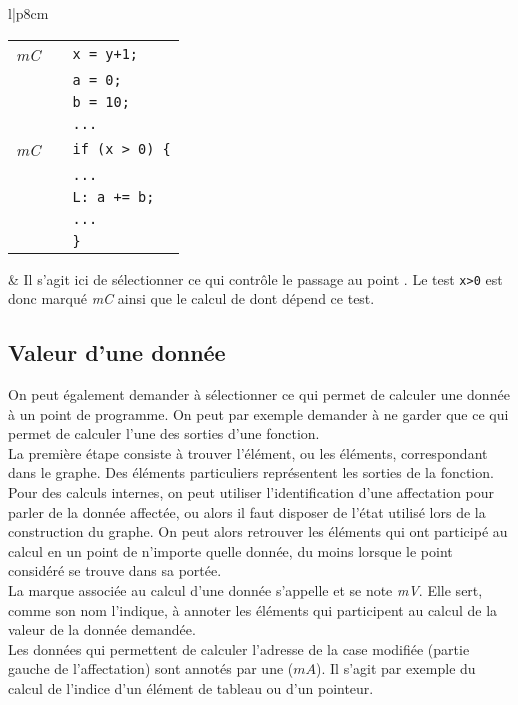 \begin{exemple}
\begin{tabular}{l|p{8cm}}
\begin{tabular}{>{\itshape}c c l}
mC  && \verb!x = y+1;!\\
  && \verb!a = 0;!\\
  && \verb!b = 10;!\\
  && \verb!...!\\
mC  && \verb!if (x > 0) {!\\
  && \verb!...!\\
  && \verb!L: a += b;!\\
  && \verb!...!\\
  && \verb!}!\\
\end{tabular}
&
Il s'agit ici de sélectionner ce qui contrôle le passage au point .
Le test \verb!x>0! est donc marqué {\it mC} ainsi que le calcul de 
dont dépend ce test.
\end{tabular}
\end{exemple}

\subsection{Valeur d'une donnée}

On peut également demander à sélectionner ce qui permet de calculer une donnée
à un point de programme.
On peut par exemple demander à ne garder que ce qui permet de calculer l'une des
sorties d'une fonction.\\

La première étape consiste à trouver l'élément, ou les éléments,
correspondant dans le graphe.
Des éléments particuliers représentent les sorties de la fonction.
Pour des calculs internes,
on peut utiliser l'identification d'une affectation pour parler de la donnée
affectée, ou alors
il faut disposer de l'état utilisé lors de la construction du graphe.
On peut alors retrouver les éléments qui ont participé au calcul en un point
de n'importe quelle
donnée, du moins lorsque le point considéré se trouve dans sa portée.\\

La marque associée au calcul d'une donnée s'appelle
et se note {\it mV}. Elle sert, comme son nom l'indique,
à annoter les éléments qui participent au calcul
de la valeur de la donnée demandée. \\

Les données qui permettent de calculer l'adresse de la case modifiée (partie
gauche de l'affectation)
sont annotés par une  ($mA$).
Il s'agit par exemple du calcul de l'indice d'un élément de tableau ou d'un
pointeur.\\

